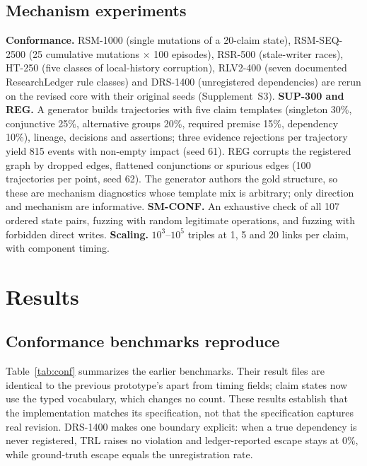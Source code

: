 \documentclass[journal]{IEEEtran}
\newcommand{\suppl}[1]{Supplement~#1}
\begin{document}
\subsection{Mechanism experiments}
\textbf{Conformance.} RSM-1000 (single mutations of a 20-claim state), RSM-SEQ-2500 (25 cumulative mutations $\times$ 100 episodes), RSR-500 (stale-writer races), HT-250 (five classes of local-history corruption), RLV2-400 (seven documented ResearchLedger rule classes) and DRS-1400 (unregistered dependencies) are rerun on the revised core with their original seeds (\suppl{S3}). \textbf{SUP-300 and REG.} A generator builds trajectories with five claim templates (singleton 30\%, conjunctive 25\%, alternative groups 20\%, required premise 15\%, dependency 10\%), lineage, decisions and assertions; three evidence rejections per trajectory yield 815 events with non-empty impact (seed 61). REG corrupts the registered graph by dropped edges, flattened conjunctions or spurious edges (100 trajectories per point, seed 62). The generator authors the gold structure, so these are mechanism diagnostics whose template mix is arbitrary; only direction and mechanism are informative. \textbf{SM-CONF.} An exhaustive check of all 107 ordered state pairs, fuzzing with random legitimate operations, and fuzzing with forbidden direct writes. \textbf{Scaling.} $10^3$--$10^5$ triples at 1, 5 and 20 links per claim, with component timing.

\section{Results}
\label{sec:results}
\subsection{Conformance benchmarks reproduce}
Table~\ref{tab:conf} summarizes the earlier benchmarks. Their result files are identical to the previous prototype's apart from timing fields; claim states now use the typed vocabulary, which changes no count. These results establish that the implementation matches its specification, not that the specification captures real revision. DRS-1400 makes one boundary explicit: when a true dependency is never registered, TRL raises no violation and ledger-reported escape stays at 0\%, while ground-truth escape equals the unregistration rate.
\end{document}
